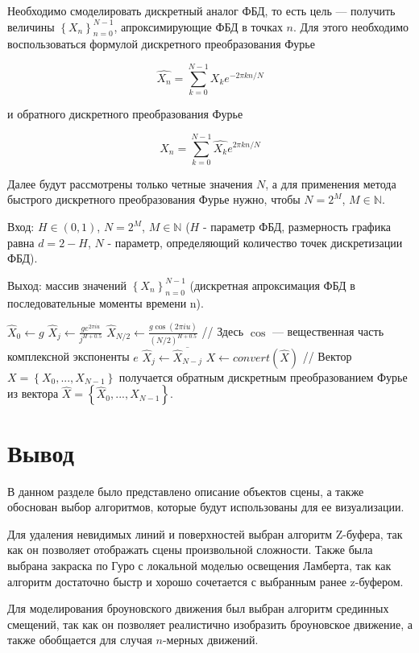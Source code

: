 Необходимо смоделировать дискретный аналог ФБД, то есть цель --- получить величины $\left\{X_n\right\}_{n=0}^{N-1}$, апроксимирующие ФБД в точках $n$. Для этого необходимо воспользоваться формулой дискретного преобразования Фурье

\begin{equation}
	\hat{X_n} = \sum_{k=0}^{N-1}X_ke^{-2\pi kn/N}
\end{equation}

и обратного дискретного преобразования Фурье

\begin{equation}
	X_n = \sum_{k=0}^{N-1}\hat{X_k}e^{2\pi kn/N}
\end{equation}

Далее будут рассмотрены только четные значения $N$, а для применения метода быстрого дискретного преобразования Фурье нужно, чтобы $N=2^M$, $M \in \mathbb{N}$. 

Вход: $H \in (0,1)$, $N=2^M$, $M \in \mathbb{N}$ ($H$ - параметр ФБД, размерность графика равна $d = 2 - H$, $N$ - параметр, определяющий количество точек дискретизации ФБД).

Выход: массив значений $\left\{X_n\right\}_{n=0}^{N-1}$ (дискретная апроксимация ФБД в последовательные моменты времени n).

\begin{algorithmic}[1]
	\State $\hat{X}_0\gets g$
	\State $\hat{X}_j \gets \frac{ge^{2\pi iu}}{j^{H+0.5}}$
	\EndFor
	\State $\hat{X}_{N/2} \gets \frac{g\cos(2\pi iu)}{(N/2)^{H+0.5}}$ // Здесь $\cos$ — вещественная часть комплексной экспоненты $e$
	\State $\hat{X}_j \gets \overline{\hat{X}_{N-j}}$
	\EndFor
	\State $X \gets convert(\hat{X})$ // Вектор $X = \left\{X_0,...,X_{N-1}\right\}$ получается обратным дискретным преобразованием Фурье из вектора $\hat{X} = \left\{\hat{X}_0,...,\hat{X}_{N-1}\right\}$.
\end{algorithmic}

\section*{Вывод}
В данном разделе было представлено описание объектов сцены, а также обоснован выбор алгоритмов, которые будут использованы для ее визуализации.

Для удаления невидимых линий и поверхностей выбран алгоритм Z-буфера, так как он позволяет отображать сцены произвольной сложности.
Также была выбрана закраска по Гуро с локальной моделью освещения Ламберта, так как алгоритм достаточно быстр и хорошо сочетается с выбранным ранее z-буфером.

Для моделирования броуновского движения был выбран алгоритм срединных смещений, так как он позволяет реалистично изобразить броуновское движение, а также обобщается для случая $n$-мерных движений.
